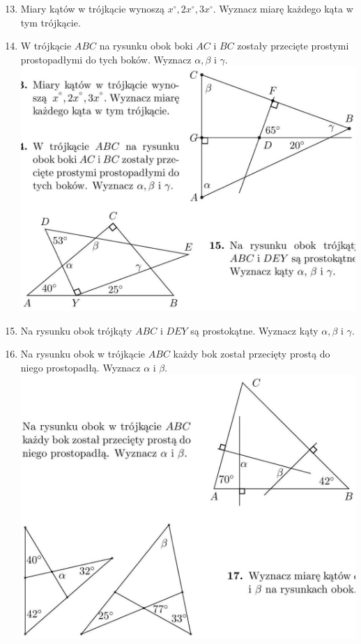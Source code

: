 \documentclass[10pt]{article}
\begin{document}
\begin{enumerate}
  \setcounter{enumi}{12}
  \item Miary kątów w trójkącie wynoszą \(x^{\circ}, 2 x^{\circ}, 3 x^{\circ}\). Wyznacz miarę każdego kąta w tym trójkącie.
  \item W trójkącie \(A B C\) na rysunku obok boki \(A C\) i \(B C\) zostały przecięte prostymi prostopadłymi do tych boków. Wyznacz \(\alpha, \beta\) i \(\gamma\).\\
\includegraphics[max width=\textwidth, center]{2024_11_21_8f01584889ff06348ae7g-191}
  \item Na rysunku obok trójkąty \(A B C\) i \(D E Y\) są prostokątne. Wyznacz kąty \(\alpha, \beta\) i \(\gamma\).
  \item Na rysunku obok w trójkącie \(A B C\) każdy bok został przecięty prostą do niego prostopadłą. Wyznacz \(\alpha\) i \(\beta\).\\
\includegraphics[max width=\textwidth, center]{2024_11_21_8f01584889ff06348ae7g-191(1)}

\end{enumerate}
\end{document}
